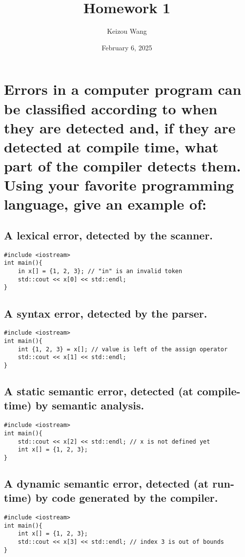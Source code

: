 \documentclass[letterpaper]{article}
\title{Homework 1}
\author{Keizou Wang}
\date{February 6, 2025}
\begin{document}
\maketitle

\section{Errors in a computer program can be classified according to when they are detected and, if they are detected at compile time, what part of the compiler detects them. Using your favorite programming language, give an example of:}
\subsection{A lexical error, detected by the scanner.}
\begin{adjustwidth}{2.35em}{0pt}
\begin{lstlisting}
#include <iostream>
int main(){
	in x[] = {1, 2, 3}; // "in" is an invalid token
	std::cout << x[0] << std::endl;
}
\end{lstlisting}
\end{adjustwidth}
\subsection{A syntax error, detected by the parser.}
\begin{adjustwidth}{2.35em}{0pt}
\begin{lstlisting}
#include <iostream>
int main(){
	int {1, 2, 3} = x[]; // value is left of the assign operator
	std::cout << x[1] << std::endl;
}
\end{lstlisting}
\end{adjustwidth}
\subsection{A static semantic error, detected (at compile-time) by semantic analysis.}
\begin{adjustwidth}{2.35em}{0pt}
\begin{lstlisting}
#include <iostream>
int main(){
	std::cout << x[2] << std::endl; // x is not defined yet
	int x[] = {1, 2, 3};
}
\end{lstlisting}
\end{adjustwidth}
\subsection{A dynamic semantic error, detected (at run-time) by code generated by the compiler.}
\begin{adjustwidth}{2.35em}{0pt}
\begin{lstlisting}
#include <iostream>
int main(){
	int x[] = {1, 2, 3};
	std::cout << x[3] << std::endl; // index 3 is out of bounds
}
\end{lstlisting}
\end{adjustwidth}
\end{document}
